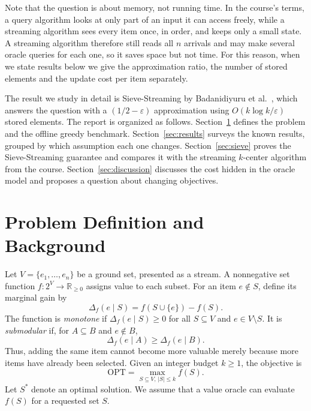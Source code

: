 \documentclass[10pt]{article}
\newcommand{\OPT}{\mathrm{OPT}}
\newcommand{\marg}[2]{\Delta_f(#1\mid #2)}
\begin{document}
Note that the question is about memory, not running time. In the course's terms, a query algorithm looks at only part of an input it can access freely, while a streaming algorithm sees every item once, in order, and keeps only a small state. A streaming algorithm therefore still reads all $n$ arrivals and may make several oracle queries for each one, so it saves space but not time. For this reason, when we state results below we give the approximation ratio, the number of stored elements and the update cost per item separately.

The result we study in detail is Sieve-Streaming by Badanidiyuru et al.\ \cite{badanidiyuru2014streaming}, which answers the question with a $(1/2-\varepsilon)$ approximation using $O(k\log k/\varepsilon)$ stored elements. The report is organized as follows. Section~\ref{sec:problem} defines the problem and the offline greedy benchmark. Section~\ref{sec:results} surveys the known results, grouped by which assumption each one changes. Section~\ref{sec:sieve} proves the Sieve-Streaming guarantee and compares it with the streaming $k$-center algorithm from the course. Section~\ref{sec:discussion} discusses the cost hidden in the oracle model and proposes a question about changing objectives.

\section{Problem Definition and Background}
\label{sec:problem}
Let $V=\{e_1,\ldots,e_n\}$ be a ground set, presented as a stream. A nonnegative set function $f:2^V\to\mathbb{R}_{\geq 0}$ assigns value to each subset. For an item $e\notin S$, define its marginal gain by
\begin{equation}
  \marg{e}{S}=f(S\cup\{e\})-f(S).
  \label{eq:marginal}
\end{equation}
The function is \emph{monotone} if $\marg{e}{S}\geq 0$ for all $S\subseteq V$ and $e\in V\setminus S$. It is \emph{submodular} if, for $A\subseteq B$ and $e\notin B$,
\begin{equation}
  \marg{e}{A}\geq\marg{e}{B}.
  \label{eq:submodular}
\end{equation}
Thus, adding the same item cannot become more valuable merely because more items have already been selected. Given an integer budget $k\geq 1$, the objective is
\begin{equation}
  \OPT=\max_{S\subseteq V,\,|S|\leq k} f(S).
  \label{eq:problem}
\end{equation}
Let $S^*$ denote an optimal solution. We assume that a value oracle can evaluate $f(S)$ for a requested set $S$.
\end{document}
